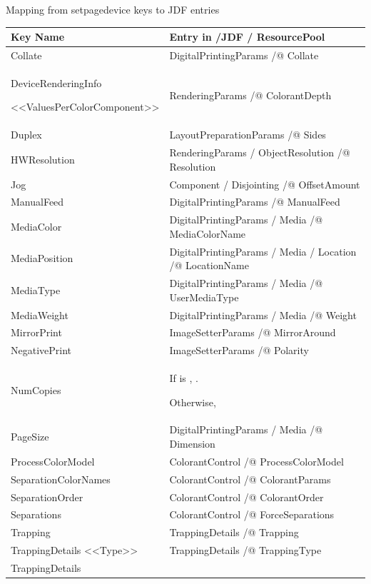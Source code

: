\documentclass[letterpaper,12pt,english,openany,oneside]{sphinxmanual}
\begin{document}
Mapping from setpagedevice keys to JDF entries


\begin{savenotes}\sphinxattablestart
\centering
\begin{tabulary}{\linewidth}[t]{|T|T|}
\hline
\sphinxstyletheadfamily 
Key Name
&\sphinxstyletheadfamily 
Entry in /JDF / ResourcePool
\\
\hline
Collate
&
DigitalPrintingParams /@ Collate
\\
\hline
DeviceRenderingInfo

<<ValuesPerColorComponent>>
&
RenderingParams /@ ColorantDepth
\\
\hline
Duplex
&
LayoutPreparationParams /@ Sides
\\
\hline
HWResolution
&
RenderingParams / ObjectResolution /@ Resolution
\\
\hline
Jog
&
Component / Disjointing /@ OffsetAmount
\\
\hline
ManualFeed
&
DigitalPrintingParams /@ ManualFeed
\\
\hline
MediaColor
&
DigitalPrintingParams / Media /@ MediaColorName
\\
\hline
MediaPosition
&
DigitalPrintingParams / Media / Location /@ LocationName
\\
\hline
MediaType
&
DigitalPrintingParams / Media /@ UserMediaType
\\
\hline
MediaWeight
&
DigitalPrintingParams / Media /@ Weight
\\
\hline
MirrorPrint
&
ImageSetterParams /@ MirrorAround
\\
\hline
NegativePrint
&
ImageSetterParams /@ Polarity
\\
\hline
NumCopies
&
If  is  ,  .

Otherwise, 
\\
\hline
PageSize
&
DigitalPrintingParams / Media /@ Dimension
\\
\hline
ProcessColorModel
&
ColorantControl /@ ProcessColorModel
\\
\hline
SeparationColorNames
&
ColorantControl /@ ColorantParams
\\
\hline
SeparationOrder
&
ColorantControl /@ ColorantOrder
\\
\hline
Separations
&
ColorantControl /@ ForceSeparations
\\
\hline
Trapping
&
TrappingDetails /@ Trapping
\\
\hline
TrappingDetails <<Type>>
&
TrappingDetails /@ TrappingType
\\
\hline
TrappingDetails


\end{tabulary}
\end{savenotes}
\end{document}
